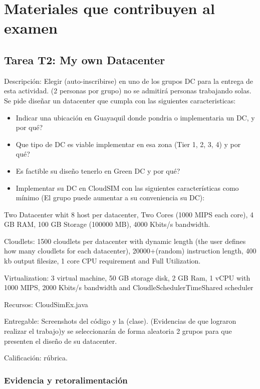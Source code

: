 \section{Materiales que contribuyen al examen}
\subsection{Tarea T2: My own Datacenter}
Descripción: Elegir (auto-inscribirse) en uno de los grupos DC para la entrega de esta actividad. (2 personas por grupo) no se admitirá personas trabajando solas.
Se pide diseñar un datacenter que cumpla con las siguientes caracteristicas:
\begin{itemize}
    \item Indicar una ubicación en Guayaquil donde pondria o implementaria un DC, y por qué?
    \item Que tipo de DC es viable implementar en esa zona (Tier 1, 2, 3, 4) y por qué?
    \item Es factible su diseño tenerlo en Green DC y por qué?
    \item Implementar su DC en CloudSIM con las siguientes características como mínimo (El grupo puede aumentar a su conveniencia su DC):
\end{itemize}
Two Datacenter whit 8 host per datacenter, Two Cores (1000 MIPS each core), 4 GB RAM, 100 GB Storage (100000 MB), 4000 Kbits/s bandwidth.

Cloudlets: 1500 cloudlets per datacenter with dynamic length (the user defines how many cloudlets for each datacenter), 20000+(random) instruction length, 400 kb output filesize, 1 core CPU requirement and Full Utilization.

Virtualization: 3 virtual machine, 50 GB storage disk, 2 GB Ram, 1 vCPU with 1000 MIPS, 2000 Kbits/s bandwidth and CloudleSchedulerTimeShared scheduler

Recursos:  CloudSimEx.java

Entregable: Screenshots del código y la (clase). (Evidencias de que lograron realizar el trabajo)y se seleccionarán de forma aleatoria 2 grupos para que presenten el diseño de su datacenter. 

Calificación: rúbrica.

\subsubsection{Evidencia y retoralimentación}



